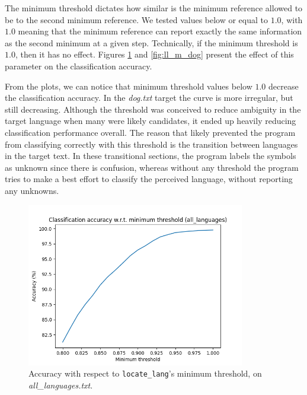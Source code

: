 \documentclass{article}
\begin{document}
The minimum threshold dictates how similar is the minimum reference allowed to be to the second minimum reference.
We tested values below or equal to $1.0$, with $1.0$ meaning that the minimum reference can report exactly the same information as the second minimum at a given step.
Technically, if the minimum threshold is $1.0$, then it has no effect.
Figures \ref{fig:ll_m_all_languages} and \ref{fig:ll_m_dog} present the effect of this parameter on the classification accuracy.

From the plots, we can notice that minimum threshold values below $1.0$ decrease the classification accuracy.
In the \textit{dog.txt} target the curve is more irregular, but still decreasing.
Although the threshold was conceived to reduce ambiguity in the target language when many were likely candidates, it ended up heavily reducing classification performance overall.
The reason that likely prevented the program from classifying correctly with this threshold is the transition between languages in the target text.
In these transitional sections, the program labels the symbols as unknown since there is confusion, whereas without any threshold the program tries to make a best effort to classify the perceived language, without reporting any unknowns.

\begin{figure}
    \centering
    \includegraphics[width=0.85\textwidth]{../results/all_languages/ll-m.png}
    \caption{Accuracy with respect to \texttt{locate\_lang}'s minimum threshold, on \textit{all\_languages.txt}.}
    \label{fig:ll_m_all_languages}
\end{figure}
\end{document}
